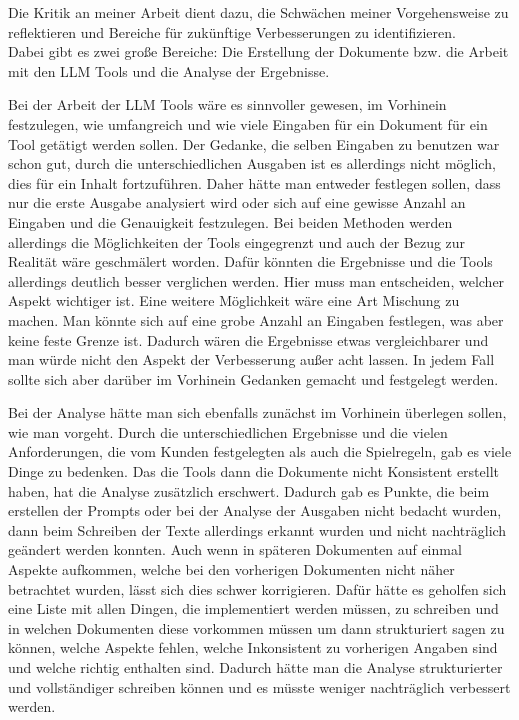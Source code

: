 Die Kritik an meiner Arbeit dient dazu, die Schwächen meiner Vorgehensweise zu reflektieren und Bereiche für zukünftige 
Verbesserungen zu identifizieren.\\
Dabei gibt es zwei große Bereiche: Die Erstellung der Dokumente bzw. die Arbeit mit den LLM Tools und die Analyse der 
Ergebnisse.

Bei der Arbeit der LLM Tools wäre es sinnvoller gewesen, im Vorhinein festzulegen, wie umfangreich und wie viele Eingaben 
für ein Dokument für ein Tool getätigt werden sollen. Der Gedanke, die selben Eingaben zu benutzen war schon gut, durch 
die unterschiedlichen Ausgaben ist es allerdings nicht möglich, dies für ein Inhalt fortzuführen. Daher hätte man 
entweder festlegen sollen, dass nur die erste Ausgabe analysiert wird oder sich auf eine gewisse Anzahl an Eingaben 
und die Genauigkeit festzulegen. Bei beiden Methoden werden allerdings die Möglichkeiten der Tools eingegrenzt und auch der 
Bezug zur Realität wäre geschmälert worden. Dafür könnten die Ergebnisse und die Tools allerdings deutlich besser verglichen werden.
Hier muss man entscheiden, welcher Aspekt wichtiger ist. Eine weitere Möglichkeit wäre eine Art Mischung zu machen. 
Man könnte sich auf eine grobe Anzahl an Eingaben festlegen, was aber keine feste Grenze ist. Dadurch wären die Ergebnisse 
etwas vergleichbarer und man würde nicht den Aspekt der Verbesserung außer acht lassen. In jedem Fall sollte sich aber darüber 
im Vorhinein Gedanken gemacht und festgelegt werden. 

Bei der Analyse hätte man sich ebenfalls zunächst im Vorhinein überlegen sollen, wie man vorgeht. Durch die unterschiedlichen
Ergebnisse und die vielen Anforderungen, die vom Kunden festgelegten als auch die Spielregeln, gab es viele Dinge zu bedenken.
Das die Tools dann die Dokumente nicht Konsistent erstellt haben, hat die Analyse zusätzlich erschwert. Dadurch gab es Punkte, die 
beim erstellen der Prompts oder bei der Analyse der Ausgaben nicht bedacht wurden, dann beim Schreiben der Texte allerdings erkannt wurden
und nicht nachträglich geändert werden konnten. Auch wenn in späteren Dokumenten auf einmal Aspekte aufkommen, welche bei den 
vorherigen Dokumenten nicht näher betrachtet wurden, lässt sich dies schwer korrigieren. Dafür hätte es geholfen sich eine 
Liste mit allen Dingen, die implementiert werden müssen, zu schreiben und in welchen Dokumenten diese vorkommen müssen um dann 
strukturiert sagen zu können, welche Aspekte fehlen, welche Inkonsistent zu vorherigen Angaben sind und welche richtig enthalten 
sind. Dadurch hätte man die Analyse strukturierter und vollständiger schreiben können und es müsste weniger nachträglich verbessert werden.

